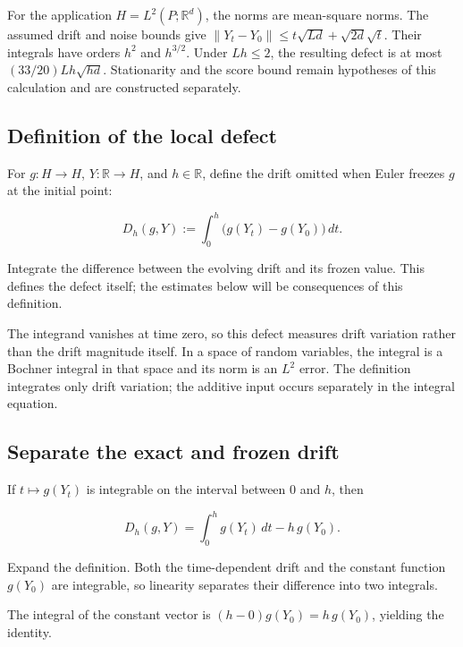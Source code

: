 \documentclass[11pt,a4paper]{report}
\begin{document}
For the application \(H=L^2(P;\mathbb R^d)\), the norms are mean-square norms. The assumed drift and noise bounds give \(\|Y_t-Y_0\|\le t\sqrt{Ld}+\sqrt{2d}\sqrt t\). Their integrals have orders \(h^2\) and \(h^{3/2}\). Under \(Lh\le2\), the resulting defect is at most \((33/20)Lh\sqrt{hd}\). Stationarity and the score bound remain hypotheses of this calculation and are constructed separately.

\subsection{\texorpdfstring{Definition of the local defect}{Definition of the local defect}}
\label{report-step-UnadjustedLangevin-LocalError-lean-1}


For \(g:H\to H\), \(Y:\mathbb R\to H\), and \(h\in\mathbb R\), define the drift omitted when Euler freezes \(g\) at the initial point:

\[D_h(g,Y):=\int_0^h\bigl(g(Y_t)-g(Y_0)\bigr)\,dt.\]

Integrate the difference between the evolving drift and its frozen value. This defines the defect itself; the estimates below will be consequences of this definition.



The integrand vanishes at time zero, so this defect measures drift variation rather than the drift magnitude itself. In a space of random variables, the integral is a Bochner integral in that space and its norm is an \(L^2\) error. The definition integrates only drift variation; the additive input occurs separately in the integral equation.

\subsection{\texorpdfstring{Separate the exact and frozen drift}{Separate the exact and frozen drift}}
\label{report-step-UnadjustedLangevin-LocalError-lean-2}


If \(t\mapsto g(Y_t)\) is integrable on the interval between \(0\) and \(h\), then

\[D_h(g,Y)=\int_0^h g(Y_t)\,dt-h\,g(Y_0).\]

Expand the definition. Both the time-dependent drift and the constant function \(g(Y_0)\) are integrable, so linearity separates their difference into two integrals.



The integral of the constant vector is \((h-0)g(Y_0)=h\,g(Y_0)\), yielding the identity.
\end{document}
